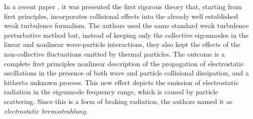 \documentclass[12pt,a4paper,ruledheader]{report}
\begin{document}
In a recent paper \cite{YZKS16}, it was presented the first rigorous
theory that, starting from first principles, incorporates collisional
effects into the already well established weak turbulence formalism.
The authors used 
the same standard weak turbulence perturbative method
but, instead of keeping only the collective eigenmodes in the linear
and nonlinear wave-particle interactions, they also kept the effects
of the non-collective fluctuations emitted by thermal particles. The
outcome is a complete first principles nonlinear description of the
propagation of electrostatic oscillations in the presence of both wave
and particle collisional dissipation, and a hitherto unknown process.
This new effect depicts the emission of electrostatic radiation in the
eigenmode frequency range, which is caused by particle scattering. 
Since this is a form of braking radiation, 
the authors named it as
\emph{electrostatic bremsstrahlung}.
\end{document}
